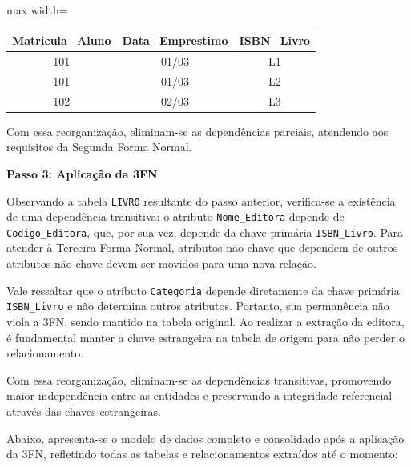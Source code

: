 \vspace{0.5cm}

\begin{adjustbox}{max width=\textwidth}
\begin{tabular}{|c|c|c|}
\hline
\textbf{\underline{Matricula\_Aluno}} & \textbf{\underline{Data\_Emprestimo}} & \textbf{\underline{ISBN\_Livro}} \\ \hline
101 & 01/03 & L1 \\ \hline
101 & 01/03 & L2 \\ \hline
102 & 02/03 & L3 \\ \hline
\end{tabular}
\end{adjustbox}

\vspace{0.3cm}

\vspace{0.4cm}

\justify

Com essa reorganização, eliminam-se as dependências parciais, atendendo aos requisitos da Segunda Forma Normal.

\vspace{0.4cm}

\textbf{Passo 3: Aplicação da 3FN}

Observando a tabela \texttt{LIVRO} resultante do passo anterior, verifica-se a existência de uma dependência transitiva: o atributo \texttt{Nome\_Editora} depende de \texttt{Codigo\_Editora}, que, por sua vez, depende da chave primária \texttt{ISBN\_Livro}. Para atender à Terceira Forma Normal, atributos não-chave que dependem de outros atributos não-chave devem ser movidos para uma nova relação. 

Vale ressaltar que o atributo \texttt{Categoria} depende diretamente da chave primária \texttt{ISBN\_Livro} e não determina outros atributos. Portanto, sua permanência não viola a 3FN, sendo mantido na tabela original. Ao realizar a extração da editora, é fundamental manter a chave estrangeira na tabela de origem para não perder o relacionamento.

Com essa reorganização, eliminam-se as dependências transitivas, promovendo maior independência entre as entidades e preservando a integridade referencial através das chaves estrangeiras.

Abaixo, apresenta-se o modelo de dados completo e consolidado após a aplicação da 3FN, refletindo todas as tabelas e relacionamentos extraídos até o momento:

